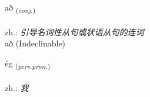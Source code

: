 \documentclass[frontgrid, backgrid]{flacards}\usepackage[]{graphicx}\usepackage[]{xcolor}
\begin{document}

\renewcommand{\flhead}{\vskip5pt \fboxsep=0pt {\small\bfseries\footnotesize Samtenging | 连词}}
\renewcommand{\fcfoot}{\vskip5pt \fboxsep=0pt \hspace{2pt}{\small\bfseries\footnotesize 1K}}

\renewcommand{\blhead}{\vskip5pt {\small\bfseries\footnotesize Samtenging | 连词 }}
\renewcommand{\bcfoot}{\vskip5pt \hspace{2pt}{\small\bfseries\footnotesize 1K}}


{að \small{\textsubscript{(\textit{conj.})}} \\[1ex]
\textphonetic{[aːð]} \\
zh.: \emph{引导名词性从句或状语从句的连词} \\  [2ex]
að (Indeclinable)}

\renewcommand{\flhead}{\vskip5pt \fboxsep=0pt {\small\bfseries\footnotesize Fornafn | 代词}}
\renewcommand{\fcfoot}{\vskip5pt \fboxsep=0pt \hspace{2pt}{\small\bfseries\footnotesize 1K}}

\renewcommand{\blhead}{\vskip5pt {\small\bfseries\footnotesize Fornafn | 代词 }}
\renewcommand{\bcfoot}{\vskip5pt \hspace{2pt}{\small\bfseries\footnotesize 1K}}


{ég \small{\textsubscript{(\textit{pers.pron.})}} \\[1ex] %
\textphonetic{[jɛːɣ]} \\
zh.: \emph{我} \\  [2ex]
\renewcommand*{\arraystretch}{0.8}
}

\renewcommand{\flhead}{\vskip5pt \fboxsep=0pt {\small\bfseries\footnotesize Sagnorð | 动词}}
\renewcommand{\fcfoot}{\vskip5pt \fboxsep=0pt \hspace{2pt}{\small\bfseries\footnotesize 1K}}
\end{document}

